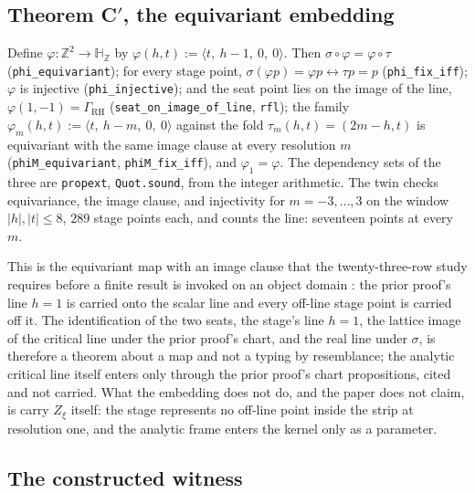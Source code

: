 \documentclass[10pt]{article}
\begin{document}
\hypertarget{theorem-c-the-equivariant-embedding}{%
\subsection{\texorpdfstring{Theorem C\('\), the equivariant
embedding}{Theorem C\textquotesingle, the equivariant embedding}}\label{theorem-c-the-equivariant-embedding}}

Define \(\varphi : \mathbb{Z}^2 \to \mathbb{H}_{\mathbb{Z}}\) by
\(\varphi(h, t) := \langle t,\ h - 1,\ 0,\ 0 \rangle\). Then
\(\sigma \circ \varphi = \varphi \circ \tau\)
(\texttt{phi\_\allowbreak equivariant}); for every stage point,
\(\sigma(\varphi p) = \varphi p \leftrightarrow \tau p = p\)
(\texttt{phi\_\allowbreak fix\_\allowbreak iff}); \(\varphi\) is
injective (\texttt{phi\_\allowbreak injective}); and the seat point lies
on the image of the line, \(\varphi(1, -1) = \Gamma_{\mathrm{RH}}\)
(\texttt{seat\_\allowbreak on\_\allowbreak image\_\allowbreak of\_\allowbreak line},
\texttt{rfl}); the family
\(\varphi_m(h, t) := \langle t,\ h - m,\ 0,\ 0 \rangle\) against the
fold \(\tau_m(h, t) = (2m - h, t)\) is equivariant with the same image
clause at every resolution \(m\)
(\texttt{phiM\_\allowbreak equivariant},
\texttt{phiM\_\allowbreak fix\_\allowbreak iff}), and
\(\varphi_1 = \varphi\). The dependency sets of the three are
\texttt{propext}, \texttt{Quot.sound}, from the integer arithmetic. The
twin checks equivariance, the image clause, and injectivity for
\(m = -3, \dots, 3\) on the window \(|h|, |t| \le 8\), \(289\) stage
points each, and counts the line: seventeen points at every \(m\).

This is the equivariant map with an image clause that the
twenty-three-row study requires before a finite result is invoked on an
object domain \cite{islamrows}: the prior proof's line \(h = 1\) is
carried onto the scalar line and every off-line stage point is carried
off it. The identification of the two seats, the stage's line \(h = 1\),
the lattice image of the critical line under the prior proof's chart,
and the real line under \(\sigma\), is therefore a theorem about a map
and not a typing by resemblance; the analytic critical line itself
enters only through the prior proof's chart propositions, cited and not
carried. What the embedding does not do, and the paper does not claim,
is carry \(Z_\xi\) itself: the stage represents no off-line point inside
the strip at resolution one, and the analytic frame enters the kernel
only as a parameter.

\hypertarget{the-constructed-witness}{%
\subsection{The constructed witness}\label{the-constructed-witness}}
\end{document}
